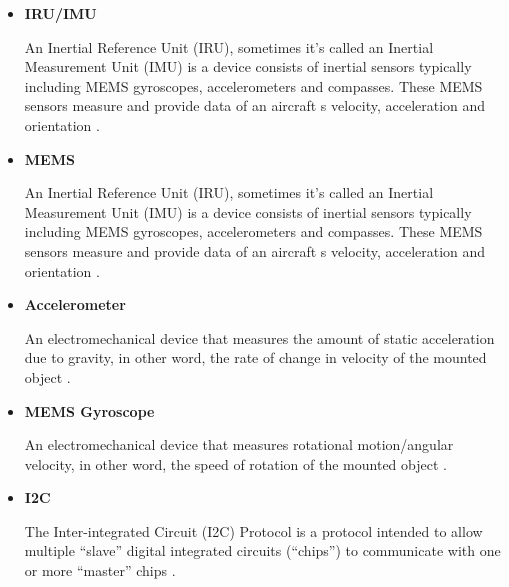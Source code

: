 \begin{itemize}
 	\item \textbf{IRU/IMU}
 	\begin{adjustwidth}{2.5em}{0pt}
	An Inertial Reference Unit (IRU), sometimes it’s called an Inertial Measurement Unit (IMU) is a device consists of inertial sensors typically including MEMS gyroscopes, accelerometers and compasses. These MEMS sensors measure and provide data of an aircraft \textquotesingle s velocity, acceleration and orientation \cite{iru}.
	\\
 	\end{adjustwidth}

 	\item \textbf{MEMS}
 	\begin{adjustwidth}{2.5em}{0pt}
	An Inertial Reference Unit (IRU), sometimes it’s called an Inertial Measurement Unit (IMU) is a device consists of inertial sensors typically including MEMS gyroscopes, accelerometers and compasses. These MEMS sensors measure and provide data of an aircraft \textquotesingle s velocity, acceleration and orientation \cite{mems}.
	\\
 	\end{adjustwidth}

 	\item \textbf{Accelerometer}
 	\begin{adjustwidth}{2.5em}{0pt}
	An electromechanical device that measures the amount of static acceleration due to gravity, in other word, the rate of change in velocity of the mounted object \cite{accelerometer}.
	\\
 	\end{adjustwidth}

 	\item \textbf{MEMS Gyroscope}
 	\begin{adjustwidth}{2.5em}{0pt}
	An electromechanical device that measures rotational motion/angular velocity, in other word, the speed of rotation of the mounted object \cite{gyroscope}.
	\\
 	\end{adjustwidth}

 	\item \textbf{I2C}
 	\begin{adjustwidth}{2.5em}{0pt}
	The Inter-integrated Circuit (I2C) Protocol is a protocol intended to allow multiple “slave” digital integrated circuits (“chips”) to communicate with one or more “master” chips \cite{i2c}.
	\\
 	\end{adjustwidth}


\end{itemize}
